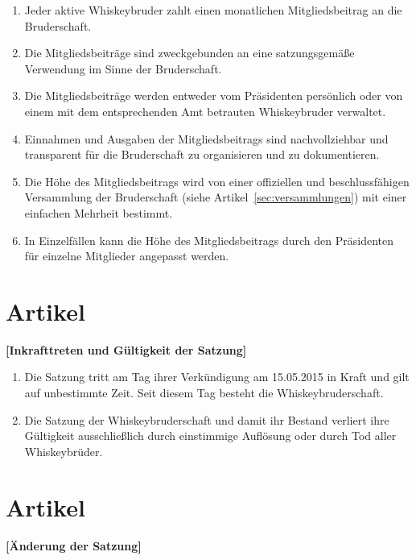 \documentclass[a4paper,12pt]{scrartcl}
\begin{document}
\begin{enumerate}

\item Jeder aktive Whiskeybruder zahlt einen monatlichen Mitgliedsbeitrag an die Bruderschaft.

\item Die Mitgliedsbeiträge sind zweckgebunden an eine satzungsgemäße Verwendung im Sinne der
  Bruderschaft.

\item Die Mitgliedsbeiträge werden entweder vom Präsidenten persönlich oder von einem mit dem
  entsprechenden Amt betrauten Whiskeybruder verwaltet.

\item Einnahmen und Ausgaben der Mitgliedsbeitrags sind nachvollziehbar und transparent für die
  Bruderschaft zu organisieren und zu dokumentieren.

\item Die Höhe des Mitgliedsbeitrags wird von einer offiziellen und beschlussfähigen Versammlung der
  Bruderschaft (siehe Artikel~\ref{sec:versammlungen}) mit einer einfachen Mehrheit bestimmt.

\item In Einzelfällen kann die Höhe des Mitgliedsbeitrags durch den Präsidenten für einzelne
  Mitglieder angepasst werden.

\end{enumerate}




\section{Artikel \thesection}
\label{sec:gültigkeit}
\textbf{[Inkrafttreten und Gültigkeit der Satzung]}

\begin{enumerate}

\item Die Satzung tritt am Tag ihrer Verkündigung am 15.05.2015 in Kraft und gilt auf unbestimmte
  Zeit. Seit diesem Tag besteht die Whiskeybruderschaft.

\item Die Satzung der Whiskeybruderschaft und damit ihr Bestand verliert ihre Gültigkeit
  ausschließlich durch einstimmige Auflösung oder durch Tod aller Whiskeybrüder.

\end{enumerate}



\section{Artikel \thesection}
\label{sec:satzungsänderungen}
\textbf{[Änderung der Satzung]}
\end{document}

